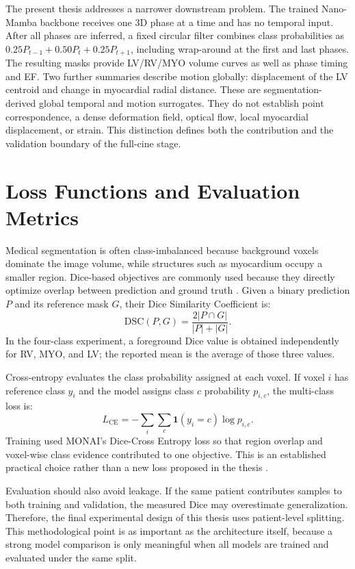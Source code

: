 The present thesis addresses a narrower downstream problem. The trained Nano-Mamba backbone receives one 3D phase at a time and has no temporal input. After all phases are inferred, a fixed circular filter combines class probabilities as $0.25P_{t-1}+0.50P_t+0.25P_{t+1}$, including wrap-around at the first and last phases. The resulting masks provide LV/RV/MYO volume curves as well as phase timing and EF. Two further summaries describe motion globally: displacement of the LV centroid and change in myocardial radial distance. These are segmentation-derived global temporal and motion surrogates. They do not establish point correspondence, a dense deformation field, optical flow, local myocardial displacement, or strain. This distinction defines both the contribution and the validation boundary of the full-cine stage.

\section{Loss Functions and Evaluation Metrics}
Medical segmentation is often class-imbalanced because background voxels dominate the image volume, while structures such as myocardium occupy a smaller region. Dice-based objectives are commonly used because they directly optimize overlap between prediction and ground truth \citep{milletari2016v,sudre2017generalised}. Given a binary prediction $P$ and its reference mask $G$, their Dice Similarity Coefficient is:
\begin{equation}
    \mathrm{DSC}(P,G)=\frac{2|P\cap G|}{|P|+|G|}.
\end{equation}
In the four-class experiment, a foreground Dice value is obtained independently for RV, MYO, and LV; the reported mean is the average of those three values.

Cross-entropy evaluates the class probability assigned at each voxel. If voxel $i$ has reference class $y_i$ and the model assigns class $c$ probability $p_{i,c}$, the multi-class loss is:
\begin{equation}
    L_{\mathrm{CE}}=-\sum_i\sum_c \mathbf{1}(y_i=c)\log p_{i,c}.
\end{equation}
Training used MONAI's Dice-Cross Entropy loss so that region overlap and voxel-wise class evidence contributed to one objective. This is an established practical choice rather than a new loss proposed in the thesis \citep{cardoso2022monai}.

Evaluation should also avoid leakage. If the same patient contributes samples to both training and validation, the measured Dice may overestimate generalization. Therefore, the final experimental design of this thesis uses patient-level splitting. This methodological point is as important as the architecture itself, because a strong model comparison is only meaningful when all models are trained and evaluated under the same split.

